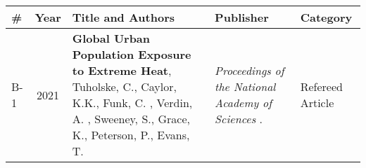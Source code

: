 
\begin{longtable}{lcp{7.75cm}>{\raggedright}p{5.25cm}p{1.75cm}}
\# & Year & Title and Authors & Publisher & Category\\
\hline 
\endhead 
    B-1 & 2021 & {\bf Global Urban Population Exposure to Extreme Heat}, Tuholske, C., Caylor, K.K., Funk, C. , Verdin, A. , Sweeney, S., Grace, K., Peterson, P., Evans, T.  & \emph{ Proceedings of the National Academy of Sciences } .   & Refereed Article\\
\end{longtable}

